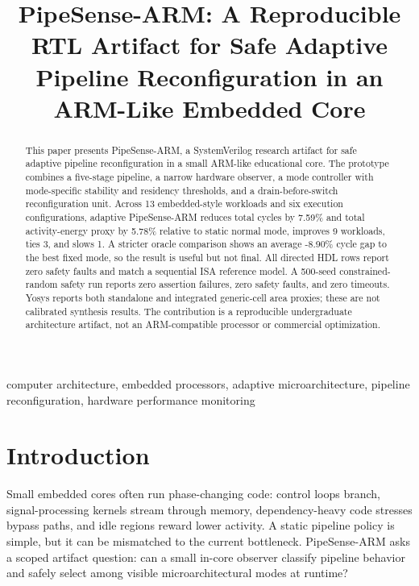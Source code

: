\documentclass[conference]{IEEEtran}
\newcommand{\pipesense}{PipeSense-ARM}
\begin{document}
\title{\pipesense: A Reproducible RTL Artifact for Safe Adaptive Pipeline Reconfiguration in an ARM-Like Embedded Core}

\author{
}

\maketitle

\begin{abstract}
This paper presents \pipesense, a SystemVerilog research artifact for safe adaptive pipeline reconfiguration in a small ARM-like educational core. The prototype combines a five-stage pipeline, a narrow hardware observer, a mode controller with mode-specific stability and residency thresholds, and a drain-before-switch reconfiguration unit. Across 13 embedded-style workloads and six execution configurations, adaptive \pipesense{} reduces total cycles by 7.59\% and total activity-energy proxy by 5.78\% relative to static normal mode, improves 9 workloads, ties 3, and slows 1. A stricter oracle comparison shows an average -8.90\% cycle gap to the best fixed mode, so the result is useful but not final. All directed HDL rows report zero safety faults and match a sequential ISA reference model. A 500-seed constrained-random safety run reports zero assertion failures, zero safety faults, and zero timeouts. Yosys reports both standalone and integrated generic-cell area proxies; these are not calibrated synthesis results. The contribution is a reproducible undergraduate architecture artifact, not an ARM-compatible processor or commercial optimization.
\end{abstract}

\begin{IEEEkeywords}
computer architecture, embedded processors, adaptive microarchitecture, pipeline reconfiguration, hardware performance monitoring
\end{IEEEkeywords}

\section{Introduction}

Small embedded cores often run phase-changing code: control loops branch, signal-processing kernels stream through memory, dependency-heavy code stresses bypass paths, and idle regions reward lower activity. A static pipeline policy is simple, but it can be mismatched to the current bottleneck. \pipesense{} asks a scoped artifact question: can a small in-core observer classify pipeline behavior and safely select among visible microarchitectural modes at runtime?
\end{document}
